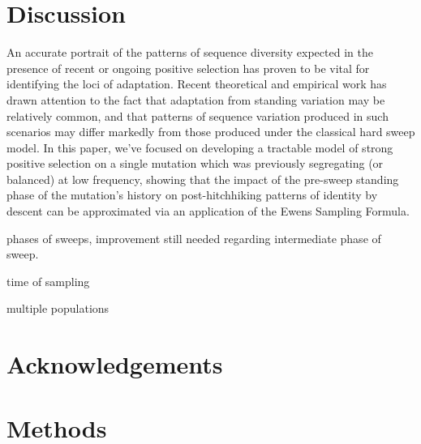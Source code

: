 \documentclass[a4paper,10pt]{article}
\newcommand{\gc}[1]{{\it \color{red} (#1)} }
\begin{document}
%
%
%
%
%

\section{Discussion}

An accurate portrait of the patterns of sequence diversity expected in the presence of recent or ongoing positive selection has proven to be vital for identifying the loci of adaptation. Recent theoretical and empirical work has drawn attention to the fact that adaptation from standing variation may be relatively common, and that patterns of sequence variation produced in such scenarios may differ markedly from those produced under the classical hard sweep model. In this paper, we've focused on developing a tractable model of strong positive selection on a single mutation which was previously segregating (or balanced) at low frequency, showing that the impact of the pre-sweep standing phase of the mutation's history on post-hitchhiking patterns of identity by descent can be approximated via an application of the Ewens Sampling Formula.



phases of sweeps, improvement still needed regarding intermediate phase of sweep.

time of sampling

multiple populations


\section{Acknowledgements}

\section{Methods}




\end{document}

